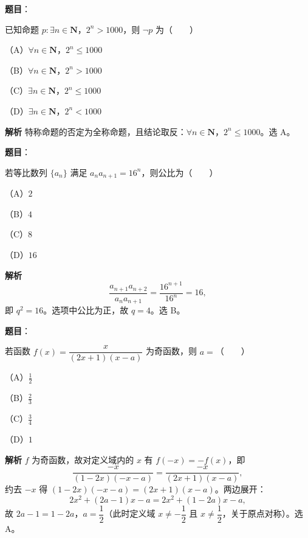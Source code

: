 \begin{answer}

\textbf{题目}：

已知命题 $p:\exists n\in\mathbf N$，$2^n>1000$，则 $\neg p$ 为\mbox{（　　）}

（A）$\forall n\in\mathbf N$，$2^n\leqslant1000$

（B）$\forall n\in\mathbf N$，$2^n>1000$

（C）$\exists n\in\mathbf N$，$2^n\leqslant1000$

（D）$\exists n\in\mathbf N$，$2^n<1000$

\textbf{解析}
特称命题的否定为全称命题，且结论取反：$\forall n\in\mathbf N$，$2^n\leqslant1000$。选 A。


\end{answer}
\begin{answer}

\textbf{题目}：

若等比数列 $\{a_n\}$ 满足 $a_na_{n+1}=16^n$，则公比为\mbox{（　　）}

（A）$2$

（B）$4$

（C）$8$

（D）$16$

\textbf{解析}
\nopagebreak[4]
\[\frac{a_{n+1}a_{n+2}}{a_na_{n+1}}=\frac{16^{n+1}}{16^n}=16,\]
即 $q^2=16$。选项中公比为正，故 $q=4$。选 B。


\end{answer}
\begin{answer}

\textbf{题目}：

若函数 $f(x)=\dfrac{x}{(2x+1)(x-a)}$ 为奇函数，则 $a=$\mbox{（　　）}

（A）$\frac12$

（B）$\frac23$

（C）$\frac34$

（D）$1$

\textbf{解析}
$f$ 为奇函数，故对定义域内的 $x$ 有 $f(-x)=-f(x)$，即
\nopagebreak[4]
\[\frac{-x}{(1-2x)(-x-a)}=\frac{-x}{(2x+1)(x-a)},\]
约去 $-x$ 得 $(1-2x)(-x-a)=(2x+1)(x-a)$。两边展开：
\nopagebreak[4]
\[2x^2+(2a-1)x-a=2x^2+(1-2a)x-a,\]
故 $2a-1=1-2a$，$a=\dfrac12$（此时定义域 $x\ne-\dfrac12$ 且 $x\ne\dfrac12$，关于原点对称）。选 A。


\end{answer}
